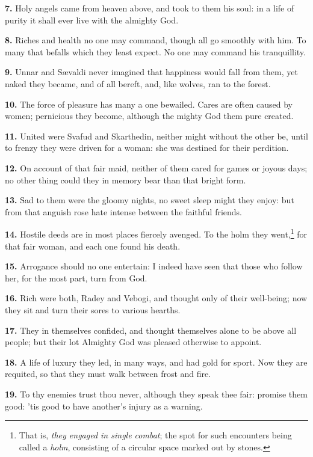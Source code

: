 \textbf{7.} Holy angels came from heaven above, and took to them his soul: in
a life of purity it shall ever live with the almighty God.

\textbf{8.} Riches and health no one may command, though all go smoothly with
him. To many that befalls which they least expect. No one may command
his tranquillity.

\textbf{9.} Unnar and Sævaldi never imagined that happiness would fall from
them, yet naked they became, and of all bereft, and, like wolves, ran
to the forest.

\textbf{10.} The force of pleasure has many a one bewailed. Cares are often
caused by women; pernicious they become, although the mighty God them
pure created.

\textbf{11.} United were Svafud and Skarthedin, neither might without the
other be, until to frenzy they were driven for a woman: she was
destined for their perdition.

\textbf{12.} On account of that fair maid, neither of them cared for games or
joyous days; no other thing could they in memory bear than that bright
form.

\textbf{13.} Sad to them were the gloomy nights, no sweet sleep might they
enjoy: but from that anguish rose hate intense between the faithful
friends.

\textbf{14.} Hostile deeds are in most places fiercely avenged. To the holm
they went,\footnote{That is, \emph{they engaged in single combat}; the spot for
such encounters being called a \emph{holm}, consisting of a circular space
marked out by stones.} for that fair woman, and each one found his death.

\textbf{15.} Arrogance should no one entertain: I indeed have seen that those
who follow her, for the most part, turn from God.

\textbf{16.} Rich were both, Radey and Vebogi, and thought only of their
well-being; now they sit and turn their sores to various hearths.

\textbf{17.} They in themselves confided, and thought themselves alone to be
above all people; but their lot Almighty God was pleased otherwise to
appoint.

\textbf{18.} A life of luxury they led, in many ways, and had gold for
sport. Now they are requited, so that they must walk between frost and
fire.

\textbf{19.} To thy enemies trust thou never, although they speak thee fair:
promise them good: 'tis good to have another's injury as a warning.

